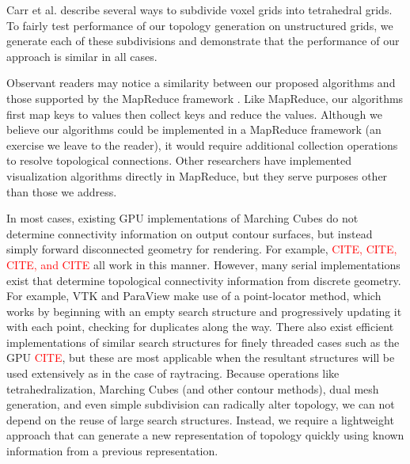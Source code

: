 \documentclass[10pt,journal,cspaper,compsoc]{IEEEtran}
\begin{document}
Carr et al. \cite{Carr2006} describe several ways to subdivide voxel grids into tetrahedral grids. To fairly test performance of our topology generation on unstructured grids, we generate each of these subdivisions and demonstrate that the performance of our approach is similar in all cases.

Observant readers may notice a similarity between our proposed algorithms and those supported by the MapReduce framework \cite{MapReduce}. Like MapReduce, our algorithms first map keys to values then collect keys and reduce the values. Although we believe our algorithms could be implemented in a MapReduce framework (an exercise we leave to the reader), it would require additional collection operations to resolve topological connections. Other researchers 
\cite{Stuart2010}\cite{Vo2011} have implemented visualization algorithms directly in MapReduce, but they serve purposes other than those we address.

In most cases, existing GPU implementations of Marching Cubes do not determine connectivity information on output contour surfaces, but instead simply forward disconnected geometry for rendering. For example, \textcolor{red}{CITE, CITE, CITE, and CITE} all work in this manner. However, many serial implementations exist that determine topological connectivity information from discrete geometry. For example, VTK and ParaView make use of a point-locator method, which works by beginning with an empty search structure and progressively updating it with each point, checking for duplicates along the way. There also exist efficient implementations of similar search structures for finely threaded cases such as the GPU \textcolor{red}{CITE}, but these are most applicable when the resultant structures will be used extensively as in the case of raytracing. Because operations like tetrahedralization, Marching Cubes (and other contour methods), dual mesh generation, and even simple subdivision can radically alter topology, we can not depend on the reuse of large search structures. Instead, we require a lightweight approach that can generate a new representation of topology quickly using known information from a previous representation.
\end{document}

